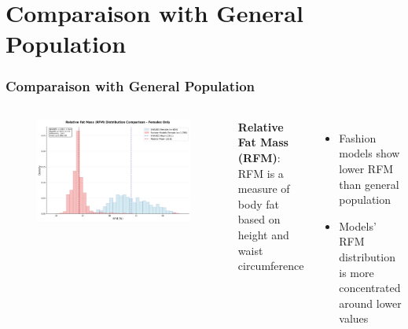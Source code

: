 \documentclass[aspectratio=169,xcolor=dvipsnames,10pt]{beamer}
\begin{document}
\section{Comparaison with General Population}

\begin{frame}[t]
    \frametitle{Comparaison with General Population}
    \begin{columns}
            \begin{figure}
                    \begin{center}
                    \includegraphics[width=\textwidth]{figures/rfm_female_distribution_comparison.png}
                    \end{center}
                \end{figure}

        \textbf{Relative Fat Mass (RFM)}: \\
            RFM is a measure of body fat based on height and waist circumference
            \begin{itemize}
                \setlength{\itemsep}{0.6em}
                \pause \item Fashion models show lower RFM than general population
                \pause \item Models' RFM distribution is more concentrated around lower values
            \end{itemize}
    
    \end{columns}

\end{frame}
\end{document}
